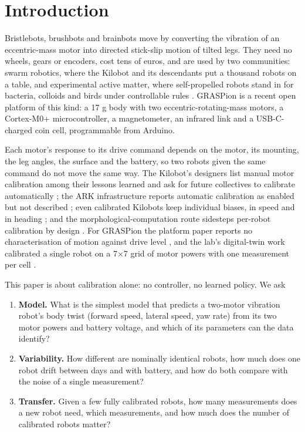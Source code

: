 \section{Introduction}\label{sec:introduction}

Bristlebots, brushbots and brainbots move by converting the vibration of
an eccentric-mass motor into directed stick-slip motion of tilted legs.
They need no wheels, gears or encoders, cost tens of euros, and are
used by two communities: swarm robotics, where the
Kilobot \cite{rubenstein2012kilobot, rubenstein2014kilobot} and its
descendants put a thousand robots on a table, and experimental active
matter, where self-propelled robots stand in for bacteria, colloids and
birds under controllable rules
\cite{giomi2013bristlebots, scholz2018inertial, benzion2023morphological, siebers2023disorder, noirhomme2025brainbots}.
GRASPion \cite{novkoski2026graspion} is a recent open platform of this
kind: a 17 g body with two eccentric-rotating-mass motors, a Cortex-M0+
microcontroller, a magnetometer, an infrared link and a USB-C-charged coin cell,
programmable from Arduino.

Each motor's
response to its drive command depends on the motor, its mounting, the
leg angles, the surface and the battery, so two robots given the same
command do not move the same way. The Kilobot's designers list manual
motor calibration among their lessons learned and ask for future
collectives to calibrate automatically \cite{rubenstein2014kilobot};
the ARK infrastructure reports automatic calibration as enabled but not
described \cite{reina2017ark}; even calibrated Kilobots keep
individual biases, in speed \cite{pinciroli2018kilobots} and in heading
\cite{raoufi2023individuality}; and the morphological-computation route
sidesteps per-robot calibration by design \cite{benzion2023morphological}.
For GRASPion the platform paper reports no characterisation of motion
against drive level \cite{novkoski2026graspion}, and the lab's digital-twin work calibrated
a single robot on a 7×7 grid of motor powers with one measurement per
cell \cite{mammadli2026twin}.

This paper is about calibration alone: no controller, no learned policy.
We ask

\begin{enumerate}
\def\labelenumi{\arabic{enumi}.}
\item
  \textbf{Model.} What is the simplest model that predicts a two-motor
  vibration robot's body twist (forward speed, lateral speed, yaw rate)
  from its two motor powers and battery voltage, and which of its
  parameters can the data identify?
\item
  \textbf{Variability.} How different are nominally identical robots,
  how much does one robot drift between days and with battery, and how
  do both compare with the noise of a single measurement?
\item
  \textbf{Transfer.} Given a few fully calibrated robots, how many
  measurements does a new robot need, which measurements, and how much
  does the number of calibrated robots matter?
\end{enumerate}

